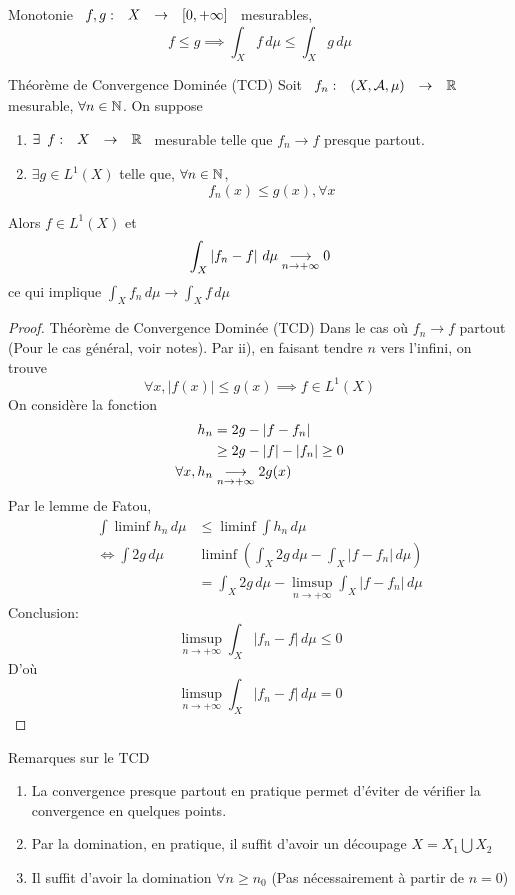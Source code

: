 \documentclass[]{report}
\begin{document}
\begin{prop}{Monotonie}{}
    $\begin{array}{ccccc} f,g : & X & \to & [0,+\infty] \end{array}$ mesurables,
    \[f\le g \implies \int_X f\, d\mu \le \int_X g \, d\mu\]
\end{prop}

\begin{tm}{Théorème de Convergence Dominée (TCD)}{}
    Soit $\begin{array}{ccccc} f_n : & (X,\mathcal{A},\mu) & \to & \mathbb{R} \end{array}$ mesurable, $\forall n\in \mathbb{N}$. On suppose
    \begin{enumerate}[label=\roman*]
        \item $\exists \begin{array}{ccccc} f : & X & \to & \mathbb{R} \end{array}$ mesurable telle que $f_n \to f$ presque partout.
        \item $\exists g\in L^1(X)$ telle que, $\forall n\in \mathbb{N}$,
              \[f_n(x)\le g(x),\forall x\]
    \end{enumerate}
    Alors $f\in L^1(X)$ et
    \[\int_X \left|f_n-f\right|\, d\mu \underset{n\to +\infty}{\longrightarrow} 0\]
    ce qui implique $\int_X f_n \, d\mu\to \int_X f\, d\mu$
\end{tm}

\begin{proof}{Théorème de Convergence Dominée (TCD)}{}
    Dans le cas où $f_n\to f$ partout (Pour le cas général, voir notes). Par ii), en faisant tendre $n$ vers l'infini, on trouve
    \[\forall x, \left|f(x)\right|\le g(x)\implies f\in L^1(X)\]
    On considère la fonction
    \begin{align*}
        h_n           & = 2g-\left|f-f_n\right| \\
                      & \ge 2g-|f|-|f_n|\ge 0   \\
        \forall x,h_n & \underset{n\to +\infty}{\longrightarrow} 2g(x)
    \end{align*}
    Par le lemme de Fatou,
    \begin{align*}
        \int \liminf h_n \, d\mu & \le \liminf \int h_n \, d\mu                                              \\
        \iff \int 2g\, d\mu      & \liminf \left(\int_X 2g\, d\mu - \int_X \left| f-f_n\right|\, d\mu\right) \\
                                 & =\int_X 2g\,d\mu -\limsup_{n\to +\infty} \int_X \left|f-f_n\right|\, d\mu
    \end{align*}
    Conclusion:
    \[\limsup_{n\to +\infty} \int_X \left|f_n-f\right|\, d\mu\le 0\]
    D'où
    \[\limsup_{n\to +\infty} \int_X \left|f_n-f\right|\, d\mu=0\]
\end{proof}

\begin{re}{Remarques sur le TCD}{}
    \begin{enumerate}
        \item La convergence presque partout en pratique permet d'éviter de vérifier la convergence en quelques points.
        \item Par la domination, en pratique, il suffit d'avoir un découpage $X=X_1\bigcup X_2$
        \item Il suffit d'avoir la domination $\forall n\ge n_0$ (Pas nécessairement à partir de $n=0$)
    \end{enumerate}
\end{re}
\end{document}
